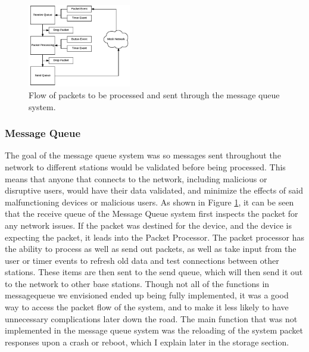 \documentclass[journal,compsoc]{IEEEtran}
\begin{document}
\begin{figure}[ht] 	%
\centering
\includegraphics[width=0.4\textwidth]{MessageQueueFlowchart.png}
\caption{ \space Flow of packets to be processed and sent through the message queue system.}
\label{Message Queue Flowchart}
\end{figure}

\subsubsection{Message Queue} 
The goal of the message queue system was so messages sent throughout the network to different stations would be validated before being processed. This means that anyone that connects to the network, including malicious or disruptive users, would have their data validated, and minimize the effects of said malfunctioning devices or malicious users. As shown in Figure \ref{Message Queue Flowchart}, it can be seen that the receive queue of the Message Queue system first inspects the packet for any network issues. If the packet was destined for the device, and the device is expecting the packet, it leads into the Packet Processor. The packet processor has the ability to process as well as send out packets, as well as take input from the user or timer events to refresh old data and test connections between other stations. These items are then sent to the send queue, which will then send it out to the network to other base stations. Though not all of the functions in messagequeue we envisioned ended up being fully implemented, it was a good way to access the packet flow of the system, and to make it less likely to have unnecessary complications later down the road. The main function that was not implemented in the message queue system was the reloading of the system packet responses upon a crash or reboot, which I explain later in the storage section.
\end{document}
